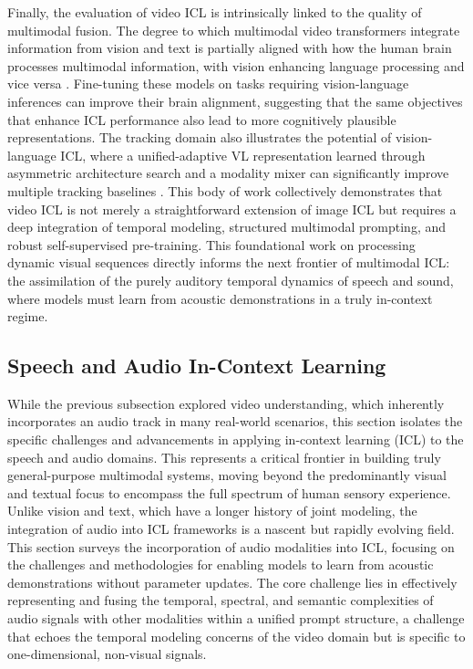 \documentclass[11pt]{article}
\begin{document}
Finally, the evaluation of video ICL is intrinsically linked to the quality of multimodal fusion. The degree to which multimodal video transformers integrate information from vision and text is partially aligned with how the human brain processes multimodal information, with vision enhancing language processing and vice versa \cite{ref279}. Fine-tuning these models on tasks requiring vision-language inferences can improve their brain alignment, suggesting that the same objectives that enhance ICL performance also lead to more cognitively plausible representations. The tracking domain also illustrates the potential of vision-language ICL, where a unified-adaptive VL representation learned through asymmetric architecture search and a modality mixer can significantly improve multiple tracking baselines \cite{ref280}. This body of work collectively demonstrates that video ICL is not merely a straightforward extension of image ICL but requires a deep integration of temporal modeling, structured multimodal prompting, and robust self-supervised pre-training. This foundational work on processing dynamic visual sequences directly informs the next frontier of multimodal ICL: the assimilation of the purely auditory temporal dynamics of speech and sound, where models must learn from acoustic demonstrations in a truly in-context regime.

\subsection{Speech and Audio In-Context Learning}

While the previous subsection explored video understanding, which inherently incorporates an audio track in many real-world scenarios, this section isolates the specific challenges and advancements in applying in-context learning (ICL) to the speech and audio domains. This represents a critical frontier in building truly general-purpose multimodal systems, moving beyond the predominantly visual and textual focus to encompass the full spectrum of human sensory experience. Unlike vision and text, which have a longer history of joint modeling, the integration of audio into ICL frameworks is a nascent but rapidly evolving field. This section surveys the incorporation of audio modalities into ICL, focusing on the challenges and methodologies for enabling models to learn from acoustic demonstrations without parameter updates. The core challenge lies in effectively representing and fusing the temporal, spectral, and semantic complexities of audio signals with other modalities within a unified prompt structure, a challenge that echoes the temporal modeling concerns of the video domain but is specific to one-dimensional, non-visual signals.
\end{document}
